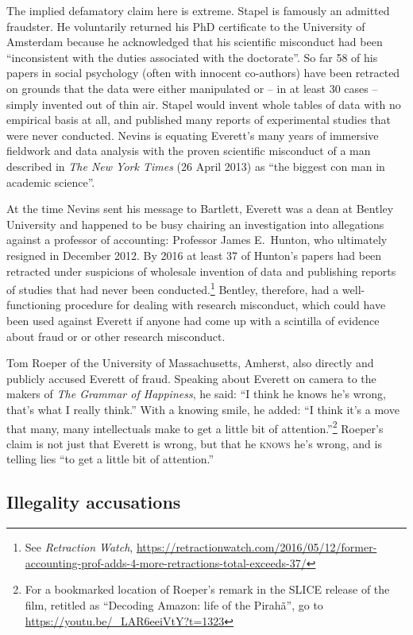 \documentclass[output=paper,colorlinks,citecolor=brown
]{langscibook}
\begin{document}
The implied defamatory claim here is extreme. Stapel is famously an
admitted fraudster. He voluntarily returned his PhD certificate to
the University of Amsterdam because he acknowledged that his scientific
misconduct had been ``inconsistent with the duties associated with the
doctorate''. So far 58 of his papers in social psychology (often with
innocent co-authors) have been retracted on grounds that the data
were either manipulated or -- in at least 30 cases -- simply invented
out of thin air. Stapel would invent whole tables of data with no
empirical basis at all, and published many reports of experimental
studies that were never conducted. Nevins is equating Everett's many
years of immersive fieldwork and data analysis with the proven
scientific misconduct of a man described in \textit{The New York
Times} (26 April 2013) as ``the biggest con man in academic science''.

At the time Nevins sent his message to Bartlett, Everett was a dean
at Bentley University and happened to be busy chairing an investigation
into allegations against a professor of accounting: Professor James
E.\ Hunton, who ultimately resigned in December 2012. By 2016 at
least 37 of Hunton's papers had been retracted under suspicions of
wholesale invention of data and publishing reports of studies that
had never been conducted.\footnote{%
   See \textit{Retraction Watch},
   \url{https://retractionwatch.com/2016/05/12/former-accounting-prof-adds-4-more-retractions-total-exceeds-37/}}
Bentley, therefore, had a well-functioning procedure for dealing with
research misconduct, which could have been used against Everett if
anyone had come up with a scintilla of evidence about fraud or or other
research misconduct.

Tom Roeper of the University of Massachusetts, Amherst, also directly
and publicly accused Everett of fraud. Speaking about Everett on camera
to the makers of \textit{The Grammar of Happiness}, he said: ``I think he
knows he's wrong, that's what I really think.'' With a knowing smile, he
added: ``I think it's a move that many, many intellectuals make to get a
little bit of attention.''\footnote{%
   For a bookmarked location of Roeper's remark in the SLICE release
   of the film, retitled as ``Decoding Amazon: life of the Pirah{\~a}'',
   go to \url{https://youtu.be/_LAR6eeiVtY?t=1323}}
Roeper's claim is not just that Everett is wrong, but that he
\textsc{knows} he's wrong, and is telling lies ``to get a little bit
of attention.''

\subsection{Illegality accusations}
\end{document}
